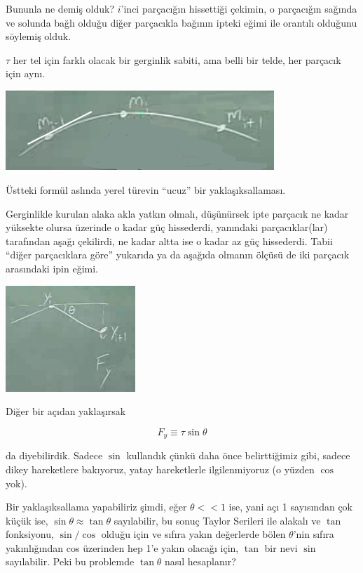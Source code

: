 \documentclass[12pt,fleqn]{article}\usepackage{../../common}
\begin{document}
Bununla ne demiş olduk? $i$'inci parçacığın hissettiği çekimin, o
parçacığın sağında ve solunda bağlı olduğu diğer parçacıkla bağının ipteki
eğimi ile orantılı olduğunu söylemiş olduk.

$\tau$ her tel için farklı olacak bir gerginlik sabiti, ama belli bir
telde, her parçacık için aynı. 

\includegraphics[height=3cm]{1_08.png}

Üstteki formül aslında yerel türevin ``ucuz'' bir yaklaşıksallaması. 

Gerginlikle kurulan alaka akla yatkın olmalı, düşünürsek ipte parçacık ne
kadar yüksekte olursa üzerinde o kadar güç hissederdi, yanındaki
parçacıklar(lar) tarafından aşağı çekilirdi, ne kadar altta ise o kadar az
güç hissederdi. Tabii ``diğer parçacıklara göre'' yukarıda ya da aşağıda
olmanın ölçüsü de iki parçacık arasındaki ipin eğimi. 

\includegraphics[height=4cm]{1_09.png}

Diğer bir açıdan yaklaşırsak

$$ F_y \equiv \tau \sin\theta $$

da diyebilirdik. Sadece $\sin$ kullandık çünkü daha önce belirttiğimiz gibi,
sadece dikey hareketlere bakıyoruz, yatay hareketlerle ilgilenmiyoruz (o
yüzden $\cos$ yok).

Bir yaklaşıksallama yapabiliriz şimdi, eğer $\theta << 1$ ise, yani açı 1
sayısından çok küçük ise, $\sin \theta \approx \tan \theta$ sayılabilir, bu
sonuç Taylor Serileri ile alakalı ve $\tan$ fonksiyonu, $\sin / \cos$
olduğu için ve sıfıra yakın değerlerde bölen $\theta$'nin sıfıra
yakınlığından cos üzerinden hep 1'e yakın olacağı için, $\tan$ bir nevi
$\sin$ sayılabilir. Peki bu problemde $\tan \theta$ nasıl hesaplanır?
\end{document}
